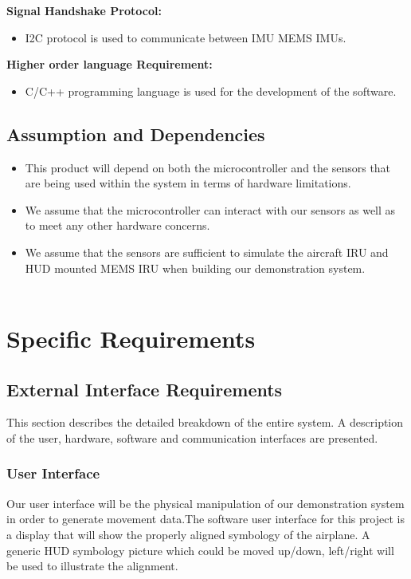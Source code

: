 \textbf{Signal Handshake Protocol:}
\begin{itemize}
	\item 
	I2C protocol is used to communicate between IMU MEMS IMUs.
	\\
\end{itemize}

\textbf{Higher order language Requirement:}
\begin{itemize}
	\item 
	C/C++ programming language is used for the development of the software. 
\end{itemize}

\subsection{Assumption and Dependencies}
\begin{itemize}
	\item 
	This product will depend on both the microcontroller and the sensors that are being used within the system in terms of hardware limitations.
	\item 
	We assume that the microcontroller can interact with our sensors as well as to meet any other hardware concerns.
	\item 
	We assume that the sensors are sufficient to simulate the aircraft IRU and HUD mounted MEMS IRU when building our demonstration system.
	\\\\
\end{itemize}




\section{Specific Requirements}
\subsection{External Interface Requirements}
This section describes the detailed breakdown of the entire system. A description of the user, hardware, software and communication interfaces are presented.

\subsubsection{User Interface}
Our user interface will be the physical manipulation of our demonstration system in order to generate movement data.The software user interface for this project is a display that will show the properly aligned symbology of the airplane. A generic HUD symbology picture which could be moved up/down, left/right will be used to illustrate the alignment.
\\

